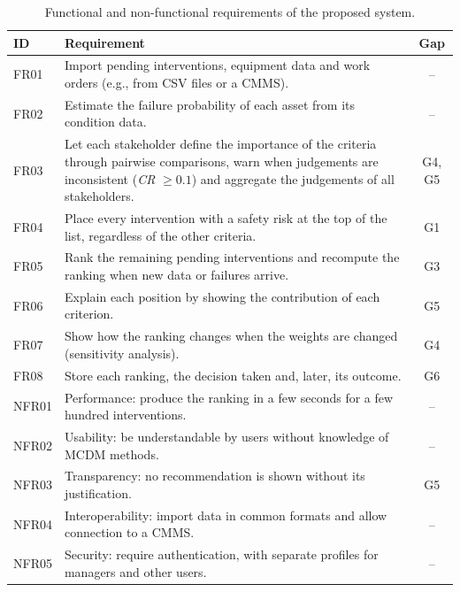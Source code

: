 \begin{table}[!htbp]
\centering
\caption{Functional and non-functional requirements of the proposed system.}
\label{tab:requirements}
\scriptsize
\begin{tabular}{|p{0.9cm}|>{\raggedright\arraybackslash}p{9.0cm}|c|}
\hline
\textbf{ID} & \textbf{Requirement} & \textbf{Gap} \\
\hline
FR01 & Import pending interventions, equipment data and work orders (e.g., from CSV files or a CMMS). & -- \\
FR02 & Estimate the failure probability of each asset from its condition data. & -- \\
FR03 & Let each stakeholder define the importance of the criteria through pairwise comparisons, warn when judgements are inconsistent (\textit{CR} $\geq 0.1$) and aggregate the judgements of all stakeholders. & G4, G5 \\
FR04 & Place every intervention with a safety risk at the top of the list, regardless of the other criteria. & G1 \\
FR05 & Rank the remaining pending interventions and recompute the ranking when new data or failures arrive. & G3 \\
FR06 & Explain each position by showing the contribution of each criterion. & G5 \\
FR07 & Show how the ranking changes when the weights are changed (sensitivity analysis). & G4 \\
FR08 & Store each ranking, the decision taken and, later, its outcome. & G6 \\
\hline
NFR01 & Performance: produce the ranking in a few seconds for a few hundred interventions. & -- \\
NFR02 & Usability: be understandable by users without knowledge of MCDM methods. & -- \\
NFR03 & Transparency: no recommendation is shown without its justification. & G5 \\
NFR04 & Interoperability: import data in common formats and allow connection to a CMMS. & -- \\
NFR05 & Security: require authentication, with separate profiles for managers and other users. & -- \\
\hline
\end{tabular}
\end{table}

